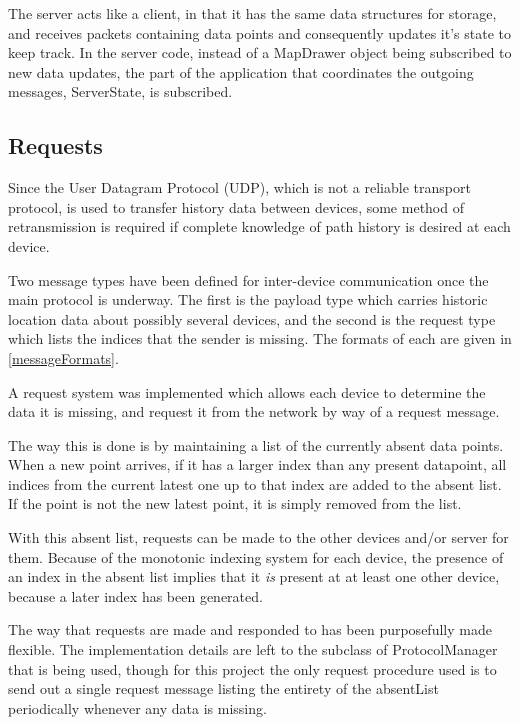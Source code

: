 The server acts like a client, in that it has the same data structures for storage, and receives packets containing data points and consequently updates it's state to keep track. In the server code, instead of a MapDrawer object being subscribed to new data updates, the part of the application that coordinates the outgoing messages, ServerState, is subscribed.

\subsection{Requests}

Since the User Datagram Protocol (UDP), which is not a reliable transport protocol, is used to transfer history data between devices, some method of retransmission is required if complete knowledge of path history is desired at each device.

Two message types have been defined for inter-device communication once the main protocol is underway. The first is the payload type which carries historic location data about possibly several devices, and the second is the request type which lists the indices that the sender is missing. The formats of each are given in \ref{messageFormats}.

A request system was implemented which allows each device to determine the data it is missing, and request it from the network by way of a request message.

The way this is done is by maintaining a list of the currently absent data points. When a new point arrives, if it has a larger index than any present datapoint, all indices from the current latest one up to that index are added to the absent list. If the point is not the new latest point, it is simply removed from the list.

With this absent list, requests can be made to the other devices and/or server for them. Because of the monotonic indexing system for each device, the presence of an index in the absent list implies that it \emph{is} present at at least one other device, because a later index has been generated.

The way that requests are made and responded to has been purposefully made flexible. The implementation details are left to the subclass of ProtocolManager that is being used, though for this project the only request procedure used is to send out a single request message listing the entirety of the absentList periodically whenever any data is missing.

